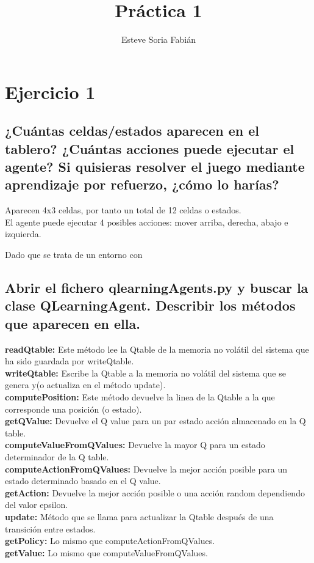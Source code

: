 \documentclass[12pt]{article}
\title{Práctica 1}
\author{Esteve Soria Fabián}
\begin{document}
    \maketitle

    \section*{Ejercicio 1}
    \subsection{¿Cuántas celdas/estados aparecen en el tablero?
    ¿Cuántas acciones puede ejecutar el agente?
    Si quisieras resolver el juego mediante aprendizaje por refuerzo, ¿cómo lo harías?}

    Aparecen 4x3 celdas, por tanto un total de 12 celdas o estados. \\
    El agente puede ejecutar 4 posibles acciones: mover arriba, derecha, abajo e izquierda.

    Dado que se trata de un entorno con
    
    \subsection{Abrir el fichero qlearningAgents.py y buscar la clase QLearningAgent. Describir los métodos que
    aparecen en ella.}
    
    \textbf{readQtable:} Este método lee la Qtable de la memoria no volátil del sistema que ha sido guardada por
    writeQtable. \\
    \textbf{writeQtable:} Escribe la Qtable a la memoria no volátil del sistema que se genera y(o actualiza en el
    método update).  \\
    \textbf{computePosition:} Este método devuelve la linea de la Qtable a la que corresponde una posición (o estado).\\
    \textbf{getQValue:} Devuelve el Q value para un par estado acción almacenado en la Q table. \\
    \textbf{computeValueFromQValues:} Devuelve la mayor Q para un estado determinador de la Q table. \\
    \textbf{computeActionFromQValues:} Devuelve la mejor acción posible para un estado determinado basado en el Q
    value. \\
    \textbf{getAction:} Devuelve la mejor acción posible o una acción random dependiendo del valor epsilon. \\
    \textbf{update:} Método que se llama para actualizar la Qtable después de una transición entre estados. \\
    \textbf{getPolicy:}  Lo mismo que computeActionFromQValues. \\
    \textbf{getValue:} Lo mismo que computeValueFromQValues. \\
\end{document}

